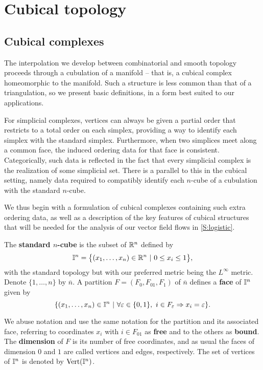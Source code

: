 
\section{Cubical topology}\label{S:cubical topology}

\subsection{Cubical complexes}

The interpolation we develop between combinatorial and smooth topology proceeds through a cubulation of a manifold -- that is, a cubical complex homeomorphic to the manifold.
Such a structure is less common than that of a triangulation, so we present basic definitions, in a form best suited to our applications.

For simplicial complexes, vertices can always be given a partial order that restricts to a total order on each simplex, providing a way to identify each simplex with the standard simplex.
Furthermore, when two simplices meet along a common face, the induced ordering data for that face is consistent.
Categorically, such data is reflected in the fact that every simplicial complex is the realization of some simplicial set.
There is a parallel to this in the cubical setting, namely data required to compatibly identify each $n$-cube of a cubulation with the standard $n$-cube.

We thus begin with a formulation of cubical complexes containing such extra ordering data, as well as a description of the key features of cubical structures that will be needed for the analysis of our vector field flows in \cref{S:logistic}.

The \textbf{standard $n$-cube} is the subset of $\mathbb{R}^n$ defined by
\begin{equation*}
	\mathbb{I}^n = \big\{ (x_1, \dots, x_n) \in \mathbb{R}^n\ |\ 0 \leq x_i \leq 1 \big\},
\end{equation*}
with the standard topology but with our preferred metric being the $L^\infty$ metric.
Denote $\{1, \dots, n\}$ by $\overline{n}$.
A partition $F = (F_0, F_{01}, F_1)$ of $\overline n$ defines a \textbf{face} of $\mathbb{I}^n$ given by
\begin{equation*}
	\{(x_1, \dots, x_n) \in \mathbb{I}^n\ |\ \forall \varepsilon \in \{0, 1\},\ i \in F_\varepsilon \Rightarrow x_i = \varepsilon\}.
\end{equation*}

We abuse notation and use the same notation for the partition and its associated face, referring to coordinates $x_i$ with $i \in F_{01}$ as \textbf{free}
and to the others as \textbf{bound}.
The \textbf{dimension} of $F$ is its number of free coordinates, and as usual the faces of dimension $0$ and $1$ are called vertices and edges, respectively.
The set of vertices of $\mathbb{I}^n$ is denoted by ${\rm Vert}(\mathbb{I}^n)$.

